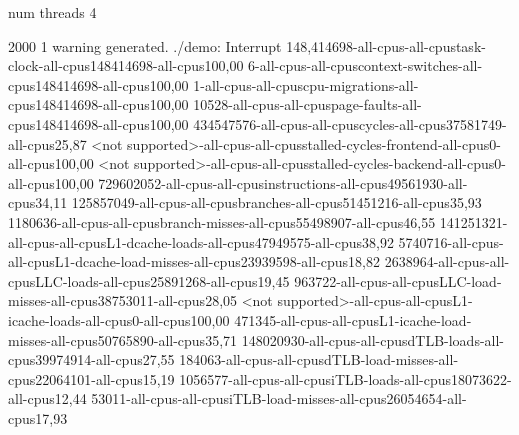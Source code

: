 num threads 4

2000
1 warning generated.
./demo: Interrupt
148,414698-all-cpus-all-cpustask-clock-all-cpus148414698-all-cpus100,00
6-all-cpus-all-cpuscontext-switches-all-cpus148414698-all-cpus100,00
1-all-cpus-all-cpuscpu-migrations-all-cpus148414698-all-cpus100,00
10528-all-cpus-all-cpuspage-faults-all-cpus148414698-all-cpus100,00
434547576-all-cpus-all-cpuscycles-all-cpus37581749-all-cpus25,87
<not supported>-all-cpus-all-cpusstalled-cycles-frontend-all-cpus0-all-cpus100,00
<not supported>-all-cpus-all-cpusstalled-cycles-backend-all-cpus0-all-cpus100,00
729602052-all-cpus-all-cpusinstructions-all-cpus49561930-all-cpus34,11
125857049-all-cpus-all-cpusbranches-all-cpus51451216-all-cpus35,93
1180636-all-cpus-all-cpusbranch-misses-all-cpus55498907-all-cpus46,55
141251321-all-cpus-all-cpusL1-dcache-loads-all-cpus47949575-all-cpus38,92
5740716-all-cpus-all-cpusL1-dcache-load-misses-all-cpus23939598-all-cpus18,82
2638964-all-cpus-all-cpusLLC-loads-all-cpus25891268-all-cpus19,45
963722-all-cpus-all-cpusLLC-load-misses-all-cpus38753011-all-cpus28,05
<not supported>-all-cpus-all-cpusL1-icache-loads-all-cpus0-all-cpus100,00
471345-all-cpus-all-cpusL1-icache-load-misses-all-cpus50765890-all-cpus35,71
148020930-all-cpus-all-cpusdTLB-loads-all-cpus39974914-all-cpus27,55
184063-all-cpus-all-cpusdTLB-load-misses-all-cpus22064101-all-cpus15,19
1056577-all-cpus-all-cpusiTLB-loads-all-cpus18073622-all-cpus12,44
53011-all-cpus-all-cpusiTLB-load-misses-all-cpus26054654-all-cpus17,93
